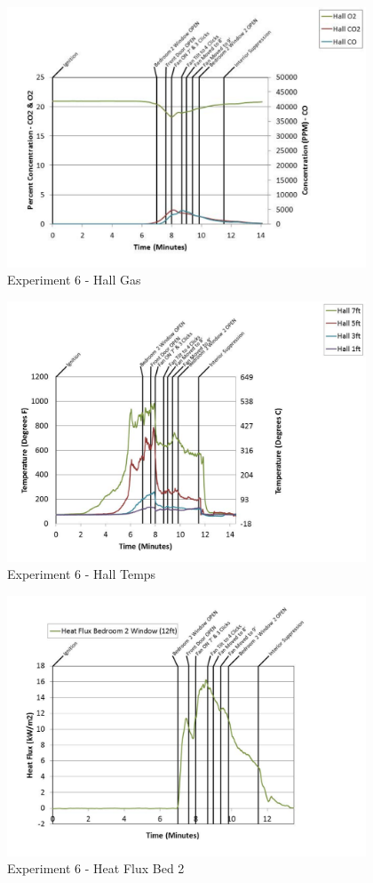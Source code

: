 \documentclass{article}
\begin{document}
\begin{appendices}
	\begin{figure}[h!]
		\centering
		\includegraphics[height=3.05in]{0_Images/Results_Charts/Exp_6_Charts/HallGas.pdf}
		\caption{Experiment 6 - Hall Gas}
	\end{figure}
 
	\clearpage

	\begin{figure}[h!]
		\centering
		\includegraphics[height=3.05in]{0_Images/Results_Charts/Exp_6_Charts/HallTemps.pdf}
		\caption{Experiment 6 - Hall Temps}
	\end{figure}
 

	\begin{figure}[h!]
		\centering
		\includegraphics[height=3.05in]{0_Images/Results_Charts/Exp_6_Charts/HeatFluxBed2.pdf}
		\caption{Experiment 6 - Heat Flux Bed 2}
	\end{figure}
 

\end{appendices}
\end{document}
